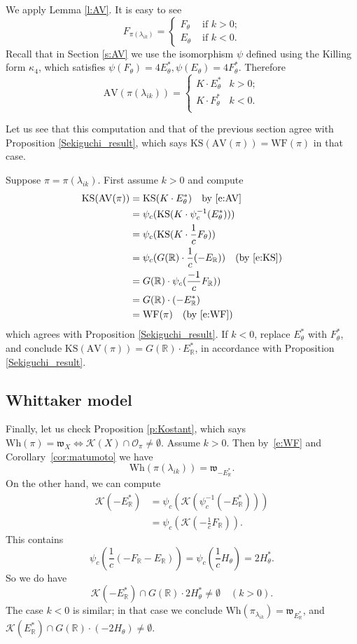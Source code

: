 \documentclass[10pt,leqno]{article}
\numberwithin{equation}{section}
\renewcommand{\O}{\mathcal O}
\newcommand{\R}{\mathbb R}
\newcommand{\K}{\mathcal K}
\newcommand\inv{^{-1}}
\newcommand{\w}{\mathfrak w}
\newcommand{\AV}{\mathrm{AV}}
\newcommand{\KS}{\mathrm{KS}}
\newcommand{\Wh}{\mathrm{Wh}}
\newcommand{\WF}{\mathrm{WF}}
\begin{document}
We apply Lemma \ref{l:AV}. It is easy to see
$$
F_{\pi(\lambda_{ik})}=
\begin{cases} F_\theta&\text{ if $k>0$;}\\
  E_\theta& \text{ if $k<0$.}
\end{cases}
$$
Recall that in Section \ref{s:AV} we use the isomorphism $\psi$ defined using the Killing form $\kappa_4$, which satisfies
$\psi(F_\theta)=4E^*_\theta, \psi(E_\theta)=4F^*_\theta$. 
Therefore
\begin{equation}
  \label{e:AV}
\AV(\pi(\lambda_{ik}))=
\begin{cases}K\cdot E_\theta^*&k>0;\\
  K\cdot F_\theta^*&k<0.\\
\end{cases}
\end{equation}

Let us see that this computation and that of the previous section agree with Proposition \ref{Sekiguchi_result}, which says $\KS(\AV(\pi))=\WF(\pi)$ in that case.

Suppose $\pi=\pi(\lambda_{ik})$. First assume $k>0$ and compute
$$
\begin{aligned}
\KS(\AV(\pi))&=  \KS(K\cdot E_\theta^*)\quad \text{by \eqref{e:AV}}\\
&=  \psi_c(\KS(K\cdot \psi_c\inv (E_\theta^*)))\\
  &=  \psi_c(\KS(K\cdot \frac 1c F_\theta))\\
&=\psi_c(G(\R)\cdot \frac 1c(-E_\R))\quad\text{(by \eqref{e:KS})}\\
&=  G(\R)\cdot \psi_c(\frac{-1}c F_\R))\\
&=G(\R)\cdot (-E_\R^*)\\
&=\WF(\pi)\quad \text{(by \eqref{e:WF})}
\end{aligned}
$$
which agrees with 
Proposition \ref{Sekiguchi_result}. If $k<0$, replace $E_\theta^*$ with $F_\theta^*$, and conclude $\KS(\AV(\pi))=G(\R)\cdot E_\R^*$, in accordance with
Proposition \ref{Sekiguchi_result}.

\subsection{Whittaker model}


Finally, let us check Proposition \ref{p:Kostant}, 
which says $\Wh(\pi)=\w_X\Leftrightarrow \K(X)\cap\O_\pi\ne \emptyset$. 
Assume $k>0$. Then by~\eqref{e:WF} and Corollary~\ref{cor:matumoto} we have
$$
\Wh(\pi(\lambda_{ik}))=\mathfrak{w}_{-E_\R^*}.
$$
On the other hand, we can compute
$$
\begin{aligned}
\K(-E_\R^*)&=\psi_c(\K(\psi_c\inv(-E_\R^*)))\\
&=\psi_c(\K( -\frac 1cF_\R)).\end{aligned}$$
This contains
$$ \psi_c\left(\frac 1c(-F_\R-E_\R)\right)=\psi_c(\frac 1cH_\theta)=2H_\theta^*.
$$
So we do have
$$
\K(-E_\R^*)\cap G(\R)\cdot 2H_{\theta}^*\ne\emptyset\quad (k>0).
$$
The case $k<0$ is similar; in that case we conclude
$\Wh(\pi_{\lambda_{ik}})=\mathfrak{w}_{E_\R^\ast}$, and $\K(E_\R^*)\cap G(\R)\cdot (-2H_\theta)\ne \emptyset$.







\end{document}
